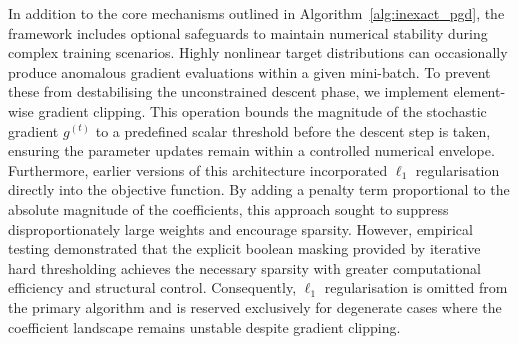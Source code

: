 In addition to the core mechanisms outlined in Algorithm~\ref{alg:inexact_pgd}, the framework includes optional safeguards to maintain numerical stability during complex training scenarios. Highly nonlinear target distributions can occasionally produce anomalous gradient evaluations within a given mini-batch. To prevent these from destabilising the unconstrained descent phase, we implement element-wise gradient clipping. This operation bounds the magnitude of the stochastic gradient $g^{(t)}$ to a predefined scalar threshold before the descent step is taken, ensuring the parameter updates remain within a controlled numerical envelope. Furthermore, earlier versions of this architecture incorporated $\ell_1$ regularisation directly into the objective function. By adding a penalty term proportional to the absolute magnitude of the coefficients, this approach sought to suppress disproportionately large weights and encourage sparsity. However, empirical testing demonstrated that the explicit boolean masking provided by iterative hard thresholding achieves the necessary sparsity with greater computational efficiency and structural control. Consequently, $\ell_1$ regularisation is omitted from the primary algorithm and is reserved exclusively for degenerate cases where the coefficient landscape remains unstable despite gradient clipping.